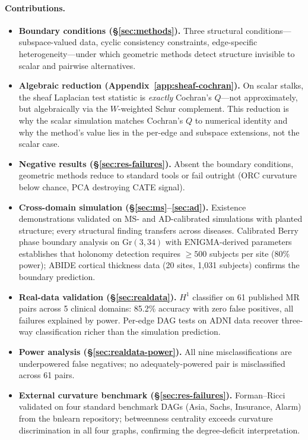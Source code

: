 \documentclass{article}
\newcommand{\Gr}{\mathrm{Gr}}
\begin{document}
\paragraph{Contributions.}
\begin{itemize}
\item \textbf{Boundary conditions (\S\ref{sec:methods}).} Three structural conditions---subspace-valued data, cyclic consistency constraints, edge-specific heterogeneity---under which geometric methods detect structure invisible to scalar and pairwise alternatives.
\item \textbf{Algebraic reduction (Appendix~\ref{app:sheaf-cochran}).} On scalar stalks, the sheaf Laplacian test statistic is \emph{exactly} Cochran's $Q$---not approximately, but algebraically via the $W$-weighted Schur complement. This reduction is why the scalar simulation matches Cochran's $Q$ to numerical identity and why the method's value lies in the per-edge and subspace extensions, not the scalar case.
\item \textbf{Negative results (\S\ref{sec:res-failures}).} Absent the boundary conditions, geometric methods reduce to standard tools or fail outright (ORC curvature below chance, PCA destroying CATE signal).
\item \textbf{Cross-domain simulation (\S\ref{sec:ms}--\ref{sec:ad}).} Existence demonstrations validated on MS- and AD-calibrated simulations with planted structure; every structural finding transfers across diseases. Calibrated Berry phase boundary analysis on $\Gr(3,34)$ with ENIGMA-derived parameters establishes that holonomy detection requires $\geq 500$ subjects per site (80\% power); ABIDE cortical thickness data (20 sites, 1{,}031 subjects) confirms the boundary prediction.
\item \textbf{Real-data validation (\S\ref{sec:realdata}).} $H^1$ classifier on 61 published MR pairs across 5 clinical domains: 85.2\% accuracy with zero false positives, all failures explained by power. Per-edge DAG tests on ADNI data recover three-way classification richer than the simulation prediction.
\item \textbf{Power analysis (\S\ref{sec:realdata-power}).} All nine misclassifications are underpowered false negatives; no adequately-powered pair is misclassified across 61 pairs.
\item \textbf{External curvature benchmark (\S\ref{sec:res-failures}).} Forman--Ricci validated on four standard benchmark DAGs (Asia, Sachs, Insurance, Alarm) from the bnlearn repository; betweenness centrality exceeds curvature discrimination in all four graphs, confirming the degree-deficit interpretation.
\end{itemize}
\end{document}
